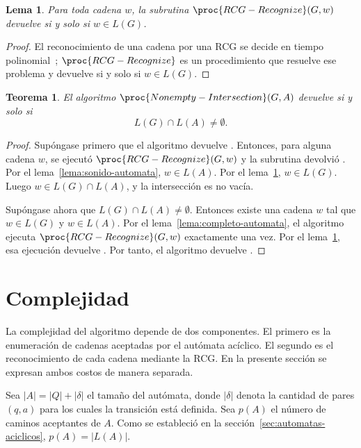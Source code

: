 \documentclass{report}
\theoremstyle{definition}
\theoremstyle{plain}
\newtheorem{teorema}{Teorema}[chapter]
\newtheorem{lema}{Lema}[chapter]
\theoremstyle{remark}
\begin{document}
\begin{lema}
\label{lema:correctitud-reconocedor}
Para toda cadena $w$, la subrutina $\proc{RCG-Recognize}(G,w)$ devuelve
 si y solo si $w \in L(G)$.
\end{lema}

\begin{proof}
El reconocimiento de una cadena por una RCG se decide en tiempo
polinomial~\cite{bertsch2001rcg,kallmeyer2010parsing}; $\proc{RCG-Recognize}$
es un procedimiento que resuelve ese problema y devuelve  si
y solo si $w \in L(G)$.
\end{proof}

\begin{teorema}
\label{teo:correctitud-enumeracion}
El algoritmo $\proc{Nonempty-Intersection}(G,A)$ devuelve
 si y solo si
\[
  L(G) \cap L(A) \neq \emptyset.
\]
\end{teorema}

\begin{proof}
Supóngase primero que el algoritmo devuelve . Entonces, para
alguna cadena $w$, se ejecutó $\proc{RCG-Recognize}(G,w)$ y la subrutina
devolvió . Por el lema~\ref{lema:sonido-automata},
$w \in L(A)$. Por el lema~\ref{lema:correctitud-reconocedor},
$w \in L(G)$. Luego $w \in L(G) \cap L(A)$, y la intersección es no
vacía.

Supóngase ahora que $L(G) \cap L(A) \neq \emptyset$. Entonces existe una
cadena $w$ tal que $w \in L(G)$ y $w \in L(A)$. Por el
lema~\ref{lema:completo-automata}, el algoritmo ejecuta
$\proc{RCG-Recognize}(G,w)$ exactamente una vez. Por el
lema~\ref{lema:correctitud-reconocedor}, esa ejecución devuelve
. Por tanto, el algoritmo devuelve .
\end{proof}

\section{Complejidad}
\label{sec:complejidad-algoritmo}

La complejidad del algoritmo depende de dos componentes. El primero es
la enumeración de cadenas aceptadas por el autómata acíclico. El
segundo es el reconocimiento de cada cadena mediante
la RCG. En la presente sección se expresan ambos costos de manera
separada.

Sea $|A|=|Q|+|\delta|$ el tamaño del autómata, donde $|\delta|$ denota
la cantidad de pares $(q,a)$ para los cuales la transición está definida.
Sea $p(A)$ el número de caminos aceptantes de $A$. Como se estableció
en la sección~\ref{sec:automatas-aciclicos}, $p(A)=|L(A)|$.
\end{document}
